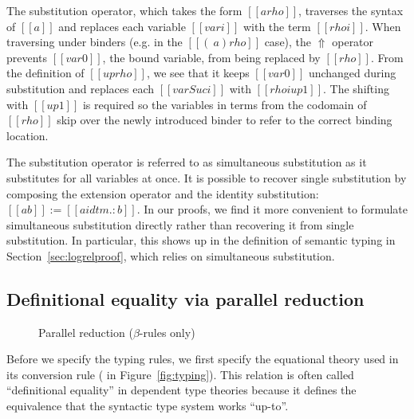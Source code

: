 \documentclass[acmsmall,screen=true,
\ifpublic review=false\else,review=true\fi
  ,anonymous=\ifanonymous true\else false\fi]{acmart}
\newcommand{\scw}[1]{}
\begin{document}
The substitution operator, which takes the form $[[a {rho}]]$,
traverses the syntax of $[[a]]$ and replaces each variable $[[var i]]$
with the term $[[rho i]]$. When traversing under binders (e.g. in the
$[[(\ a) { rho }]]$ case), the $\Uparrow$ operator prevents $[[var
0]]$, the bound variable, from being replaced by
$[[rho]]$. From the definition of $[[up rho]]$, we see that it keeps
$[[var 0]]$ unchanged during substitution and replaces each $[[var
Suc i]]$ with $[[rho i {up 1}]]$. The shifting with $[[up 1]]$
is required so the variables in terms from the codomain of $[[rho]]$ skip over
the newly introduced binder to refer to the correct binding
location. 

The substitution operator is referred to as simultaneous substitution as it
substitutes for all variables at once. It is possible to recover single
substitution by composing the extension operator and the identity
substitution: $[[a { b }]] := [[a { idtm .: b }]]$. In our proofs, we find it
more convenient to formulate simultaneous substitution directly rather than
recovering it from single substitution.  In particular, this shows up in the
definition of semantic typing in Section~\ref{sec:logrelproof}, which relies
on simultaneous substitution.

\subsection{Definitional equality via parallel reduction}

\begin{figure}[h]
\begin{minipage}{0.9\textwidth}
\end{minipage}
\caption{Parallel reduction ($\beta$-rules only) }
\label{fig:par}
\end{figure}

Before we specify the typing rules, we first specify the equational theory
used in its conversion rule ( in Figure~\ref{fig:typing}). This
relation is often called ``definitional equality'' in dependent type theories
because it defines the equivalence that the syntactic type system works
``up-to''.
\end{document}
